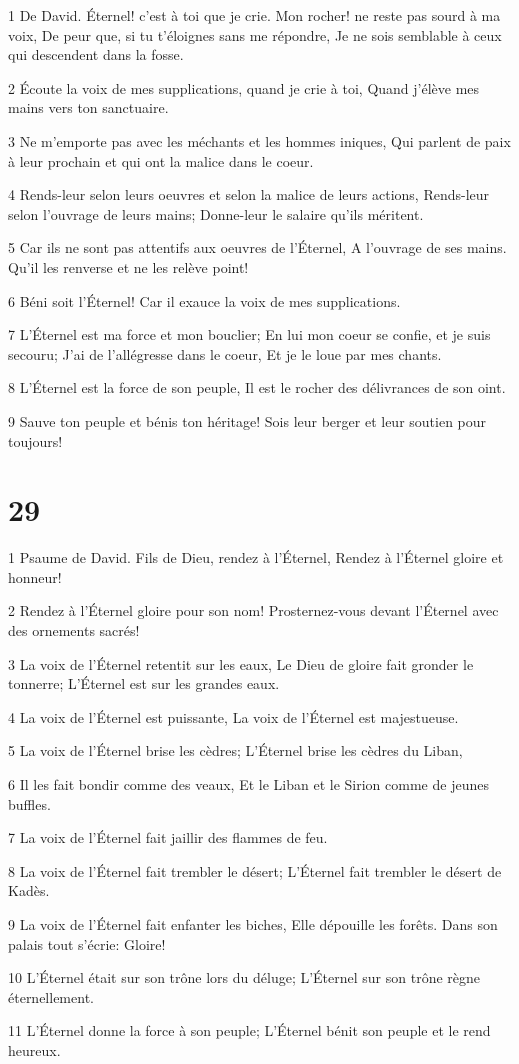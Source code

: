\par 1 De David. Éternel! c'est à toi que je crie. Mon rocher! ne reste pas sourd à ma voix, De peur que, si tu t'éloignes sans me répondre, Je ne sois semblable à ceux qui descendent dans la fosse.
\par 2 Écoute la voix de mes supplications, quand je crie à toi, Quand j'élève mes mains vers ton sanctuaire.
\par 3 Ne m'emporte pas avec les méchants et les hommes iniques, Qui parlent de paix à leur prochain et qui ont la malice dans le coeur.
\par 4 Rends-leur selon leurs oeuvres et selon la malice de leurs actions, Rends-leur selon l'ouvrage de leurs mains; Donne-leur le salaire qu'ils méritent.
\par 5 Car ils ne sont pas attentifs aux oeuvres de l'Éternel, A l'ouvrage de ses mains. Qu'il les renverse et ne les relève point!
\par 6 Béni soit l'Éternel! Car il exauce la voix de mes supplications.
\par 7 L'Éternel est ma force et mon bouclier; En lui mon coeur se confie, et je suis secouru; J'ai de l'allégresse dans le coeur, Et je le loue par mes chants.
\par 8 L'Éternel est la force de son peuple, Il est le rocher des délivrances de son oint.
\par 9 Sauve ton peuple et bénis ton héritage! Sois leur berger et leur soutien pour toujours!

\chapter{29}

\par 1 Psaume de David. Fils de Dieu, rendez à l'Éternel, Rendez à l'Éternel gloire et honneur!
\par 2 Rendez à l'Éternel gloire pour son nom! Prosternez-vous devant l'Éternel avec des ornements sacrés!
\par 3 La voix de l'Éternel retentit sur les eaux, Le Dieu de gloire fait gronder le tonnerre; L'Éternel est sur les grandes eaux.
\par 4 La voix de l'Éternel est puissante, La voix de l'Éternel est majestueuse.
\par 5 La voix de l'Éternel brise les cèdres; L'Éternel brise les cèdres du Liban,
\par 6 Il les fait bondir comme des veaux, Et le Liban et le Sirion comme de jeunes buffles.
\par 7 La voix de l'Éternel fait jaillir des flammes de feu.
\par 8 La voix de l'Éternel fait trembler le désert; L'Éternel fait trembler le désert de Kadès.
\par 9 La voix de l'Éternel fait enfanter les biches, Elle dépouille les forêts. Dans son palais tout s'écrie: Gloire!
\par 10 L'Éternel était sur son trône lors du déluge; L'Éternel sur son trône règne éternellement.
\par 11 L'Éternel donne la force à son peuple; L'Éternel bénit son peuple et le rend heureux.

